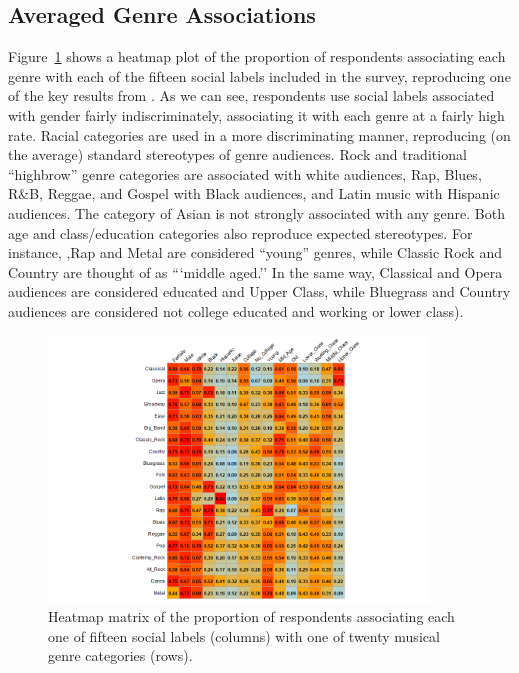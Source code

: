 \documentclass[12pt]{article}
\begin{document}
\subsection*{Averaged Genre Associations}
Figure~\ref{fig:main} shows a heatmap plot of the proportion of respondents associating each genre with each of the fifteen social labels included in the survey, reproducing one of the key results from \citet[Table 3]{lizardo2016cultural-aaa}. As we can see, respondents use social labels associated with gender fairly indiscriminately, associating it with each genre at a fairly high rate. Racial categories are used in a more discriminating manner, reproducing (on the average) standard stereotypes of genre audiences. Rock and traditional ``highbrow'' genre categories are associated with white audiences, Rap, Blues, R\&B, Reggae, and Gospel with Black audiences, and Latin music with Hispanic audiences. The category of Asian is not strongly associated with any genre. Both age and class/education categories also reproduce expected stereotypes. For instance, ,Rap and Metal are considered ``young'' genres, while Classic Rock and Country are thought of as ```middle aged.'' In the same way, Classical and Opera audiences are considered educated and Upper Class, while Bluegrass and Country audiences are considered not college educated and working or lower class). 

\begin{figure}[ht!]
    \centering
    \includegraphics[trim={7cm 0cm 6cm 0cm},clip, width=0.9\textwidth]{Plots/main.png}
    \caption{Heatmap matrix of the proportion of respondents associating each one of fifteen social labels (columns) with one of twenty musical genre categories (rows).}
    \label{fig:main}
\end{figure}
\end{document}
